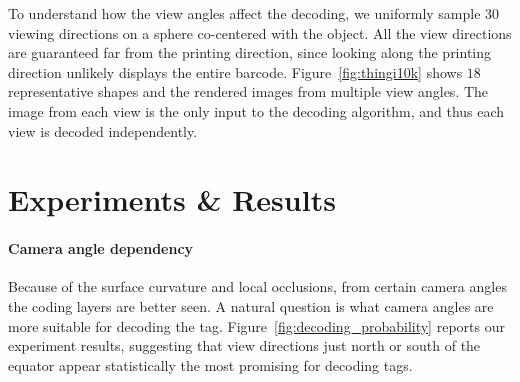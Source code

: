 \documentclass[12pt]{report}
\begin{document}
To understand how the view angles affect the decoding,
we uniformly sample 30 viewing directions on a sphere co-centered with the object.
All the view directions are guaranteed far from the printing direction, 
since looking along the printing direction unlikely displays the entire barcode.
Figure~\ref{fig:thingi10k} shows $18$ representative shapes and the rendered images from 
multiple view angles.
The image from each view is the only input to the decoding algorithm,
and thus each view is decoded independently.

\section{Experiments \& Results}\label{sec:layercode_exp}

\paragraph{Camera angle dependency}
Because of the surface curvature and local occlusions, from certain camera angles
the coding layers are better seen. A natural question is what camera angles are more suitable
for decoding the tag. Figure~\ref{fig:decoding_probability} reports our experiment results,
suggesting that view directions just north or south of the equator 
appear statistically the most promising for decoding tags.

\end{document}
